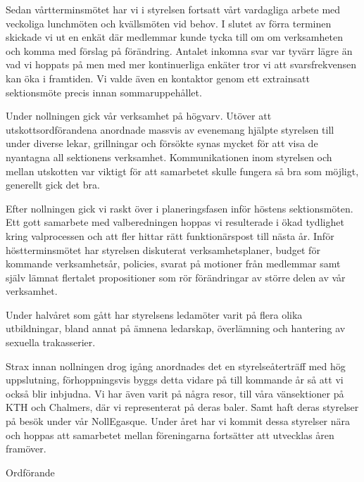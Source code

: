 \documentclass[../_main/handlingar.tex]{subfiles}
\begin{document}

Sedan vårtterminsmötet har vi i styrelsen fortsatt vårt vardagliga arbete med veckoliga lunchmöten och kvällsmöten vid behov. I slutet av förra terminen skickade vi ut en enkät där medlemmar kunde tycka till om om verksamheten och komma med förslag på förändring. Antalet inkomna svar var tyvärr lägre än vad vi hoppats på men med mer kontinuerliga enkäter tror vi att svarsfrekvensen kan öka i framtiden. Vi valde även en kontaktor genom ett extrainsatt sektionsmöte precis innan sommaruppehållet.

Under nollningen gick vår verksamhet på högvarv. Utöver att utskottsordförandena anordnade massvis av evenemang hjälpte styrelsen till under diverse lekar, grillningar och försökte synas mycket för att visa de nyantagna all sektionens verksamhet. Kommunikationen inom styrelsen och mellan utskotten var viktigt för att samarbetet skulle fungera så bra som möjligt, generellt gick det bra.

Efter nollningen gick vi raskt över i planeringsfasen inför höstens sektionsmöten. Ett gott samarbete med valberedningen hoppas vi resulterade i ökad tydlighet kring valprocessen och att fler hittar rätt funktionärspost till nästa år. Inför höstterminsmötet har styrelsen diskuterat verksamhetsplaner, budget för kommande verksamhetsår, policies, svarat på motioner från medlemmar samt själv lämnat flertalet propositioner som rör förändringar av större delen av vår verksamhet. 

Under halvåret som gått har styrelsens ledamöter varit på flera olika utbildningar, bland annat på ämnena ledarskap, överlämning och hantering av sexuella trakasserier. 

Strax innan nollningen drog igång anordnades det en styrelseåterträff med hög uppslutning, förhoppningsvis byggs detta vidare på till kommande år så att vi också blir inbjudna. Vi har även varit på några resor, till våra vänsektioner på KTH och Chalmers, där vi representerat på deras baler. Samt haft deras styrelser på besök under vår NollEgasque. Under året har vi kommit dessa styrelser nära och hoppas att samarbetet mellan föreningarna fortsätter att utvecklas åren framöver. 

\begin{signatures}{1}
    \mvh
    \signature{\ordf}{Ordförande}
\end{signatures}
\end{document}
